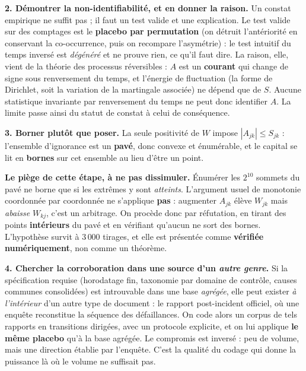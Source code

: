 \documentclass[11pt,a4paper]{article}
\begin{document}
\textbf{2. Démontrer la non-identifiabilité, et en donner la raison.} Un constat empirique ne
suffit pas ; il faut un test valide et une explication. Le test valide sur des comptages est le
\textbf{placebo par permutation} (on détruit l'antériorité en conservant la co-occurrence, puis
on recompare l'asymétrie) : le test intuitif du \og{}temps inversé\fg{} est \emph{dégénéré} et ne
prouve rien, ce qu'il faut dire. La raison, elle, vient de la théorie des processus réversibles :
$A$ est un \textbf{courant} qui change de signe sous renversement du temps, et l'énergie de
fluctuation (la forme de Dirichlet, soit la variation de la martingale associée) ne dépend que de
$S$. Aucune statistique invariante par renversement du temps ne peut donc identifier $A$. La
limite passe ainsi du statut de constat à celui de conséquence.

\textbf{3. Borner plutôt que poser.} La seule positivité de $W$ impose
$|A_{jk}| \le S_{jk}$ : l'ensemble d'ignorance est un \textbf{pavé}, donc convexe et énumérable,
et le capital se lit en \textbf{bornes} sur cet ensemble au lieu d'être un point.

\begin{cle}[colback=accent!7,colframe=accent!70!black]
\textbf{Le piège de cette étape, à ne pas dissimuler.} Énumérer les $2^{10}$ sommets du pavé ne
borne que si les extrêmes y sont \emph{atteints}. L'argument usuel de monotonie coordonnée par
coordonnée ne s'applique \textbf{pas} : augmenter $A_{jk}$ élève $W_{jk}$ mais \emph{abaisse}
$W_{kj}$, c'est un arbitrage. On procède donc par réfutation, en tirant des points
\textbf{intérieurs} du pavé et en vérifiant qu'aucun ne sort des bornes. L'hypothèse survit à
$3\,000$ tirages, et elle est présentée comme \textbf{vérifiée numériquement}, non comme un
théorème.
\end{cle}

\textbf{4. Chercher la corroboration dans une source d'un \emph{autre genre}.} Si la
spécification requise (horodatage fin, taxonomie par domaine de contrôle, causes communes
consolidées) est introuvable dans une base \emph{agrégée}, elle peut exister \emph{à l'intérieur}
d'un autre type de document : le rapport post-incident officiel, où une enquête reconstitue la
séquence des défaillances. On code alors un corpus de tels rapports en transitions dirigées, avec
un protocole explicite, et on lui applique \textbf{le même placebo} qu'à la base agrégée. Le
compromis est inversé : peu de volume, mais une direction établie par l'enquête. C'est la qualité
du codage qui donne la puissance là où le volume ne suffisait pas.
\end{document}

